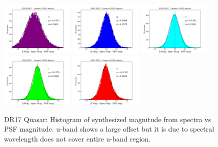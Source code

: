 \documentclass[apj,twocolumn]{aastex631}
\begin{document}
\begin{figure}%
\begin{center}
\includegraphics[angle=0,width=3.5cm]{figures/20220811_dmag_histogram_u_dr17quasars.png}
\includegraphics[angle=0,width=3.5cm]{figures/20220811_dmag_histogram_g_dr17quasars.png}
\includegraphics[angle=0,width=3.5cm]{figures/20220811_dmag_histogram_r_dr17quasars.png}
\includegraphics[angle=0,width=3.5cm]{figures/20220811_dmag_histogram_i_dr17quasars.png}
\includegraphics[angle=0,width=3.5cm]{figures/20220811_dmag_histogram_z_dr17quasars.png}
\caption{DR17 Quasar: Histogram of synthesized magnitude from spectra vs PSF magnitude.
u-band shows a large offset but it is due to spectral wavelength does not cover entire u-band region.}
\end{center}
\end{figure}
\end{document}
